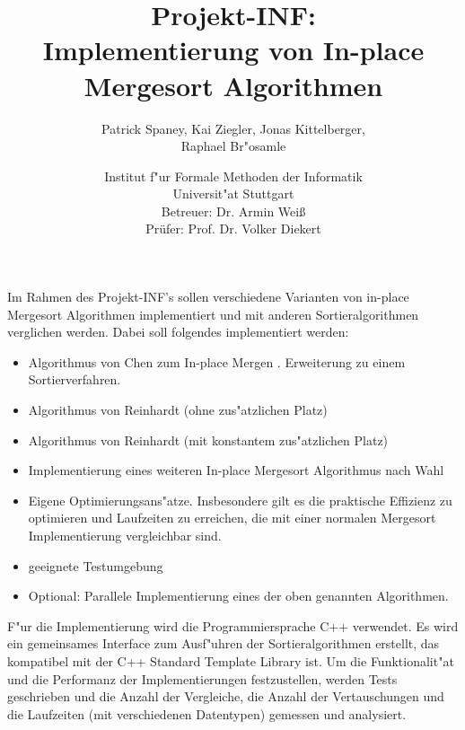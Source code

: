 \documentclass[12pt,pdftex,a4paper]{article}
\begin{document}
\title{Projekt-INF:\\
Implementierung von In-place Mergesort Algorithmen}
\author{Patrick Spaney, Kai Ziegler, Jonas Kittelberger, \\ Raphael Br"osamle}
\date{Institut f"ur Formale Methoden der Informatik \\ Universit"at Stuttgart\\
\normalsize Betreuer: Dr. Armin Weiß\\
Prüfer: Prof. Dr. Volker Diekert}
\maketitle
Im Rahmen des Projekt-INF's sollen verschiedene Varianten von in-place Mergesort Algorithmen implementiert und mit anderen Sortieralgorithmen verglichen werden.
Dabei soll folgendes implementiert werden:
\begin{itemize}
\item Algorithmus von Chen zum In-place Mergen \cite{Chen06}. Erweiterung zu einem Sortierverfahren. 
\item Algorithmus von Reinhardt \cite{Reinhardt92} (ohne zus"atzlichen Platz)
\item Algorithmus von Reinhardt (mit konstantem zus"atzlichen Platz)
\item Implementierung eines weiteren In-place Mergesort Algorithmus nach Wahl
\item Eigene Optimierungsans"atze. Insbesondere gilt es die praktische Effizienz zu optimieren und Laufzeiten zu erreichen, die mit einer normalen Mergesort Implementierung vergleichbar sind. 
\item geeignete Testumgebung
\item Optional: Parallele Implementierung eines der oben genannten Algorithmen.
\end{itemize}
F"ur die Implementierung wird die Programmiersprache C++ verwendet. Es wird ein gemeinsames Interface zum Ausf"uhren der Sortieralgorithmen erstellt, das kompatibel mit der C++ Standard Template Library ist. Um die Funktionalit"at und die Performanz der Implementierungen festzustellen, werden Tests geschrieben und die Anzahl der Vergleiche, die Anzahl der Vertauschungen und die Laufzeiten (mit verschiedenen Datentypen) gemessen und analysiert.
\end{document}
